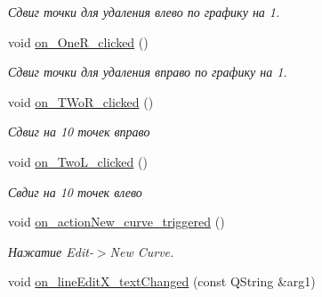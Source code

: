 \begin{DoxyCompactItemize}
\begin{DoxyCompactList}\small\item\em Сдвиг точки для удаления влево по графику на 1. \end{DoxyCompactList}\item 
void \hyperlink{class_main_window_afa3f2fb370e2b3c9064880d9aa9a8d14}{on\+\_\+\+One\+R\+\_\+clicked} ()\hypertarget{class_main_window_afa3f2fb370e2b3c9064880d9aa9a8d14}{}\label{class_main_window_afa3f2fb370e2b3c9064880d9aa9a8d14}

\begin{DoxyCompactList}\small\item\em Сдвиг точки для удаления вправо по графику на 1. \end{DoxyCompactList}\item 
void \hyperlink{class_main_window_ac38bdf92edc1e6cbd07cced4497aa964}{on\+\_\+\+T\+Wo\+R\+\_\+clicked} ()\hypertarget{class_main_window_ac38bdf92edc1e6cbd07cced4497aa964}{}\label{class_main_window_ac38bdf92edc1e6cbd07cced4497aa964}

\begin{DoxyCompactList}\small\item\em Сдвиг на 10 точек вправо \end{DoxyCompactList}\item 
void \hyperlink{class_main_window_a3fd8329ca1b8ee5d2ac4da65ee5b6617}{on\+\_\+\+Two\+L\+\_\+clicked} ()\hypertarget{class_main_window_a3fd8329ca1b8ee5d2ac4da65ee5b6617}{}\label{class_main_window_a3fd8329ca1b8ee5d2ac4da65ee5b6617}

\begin{DoxyCompactList}\small\item\em Свдиг на 10 точек влево \end{DoxyCompactList}\item 
void \hyperlink{class_main_window_a39584a1d717e2430f7c8666071760335}{on\+\_\+action\+New\+\_\+curve\+\_\+triggered} ()\hypertarget{class_main_window_a39584a1d717e2430f7c8666071760335}{}\label{class_main_window_a39584a1d717e2430f7c8666071760335}

\begin{DoxyCompactList}\small\item\em Нажатие Edit-\/$>$New Curve. \end{DoxyCompactList}\item 
void \hyperlink{class_main_window_afa3811da5b85f09d356f9c417970fb5d}{on\+\_\+line\+Edit\+X\+\_\+text\+Changed} (const Q\+String \&arg1)\hypertarget{class_main_window_afa3811da5b85f09d356f9c417970fb5d}{}\label{class_main_window_afa3811da5b85f09d356f9c417970fb5d}


\end{DoxyCompactItemize}
